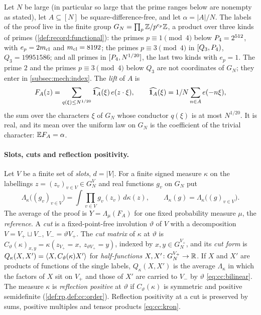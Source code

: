 Let $N$ be large (in particular so large that the prime ranges
below are nonempty as stated), let $A\subseteq[N]$ be square-difference-free, and let
$\alpha=|A|/N$. The labels of the proof live in the finite group
$G_N=\prod_p\mathbb Z/p^{e_p}\mathbb Z$, a product over three kinds of primes
(\cref{def:record:functional}): the primes $p\equiv1\pmod4$ below
$P_4=2^{512}$, with $e_p=2m_{\mathrm{cl}}$ and $m_{\mathrm{cl}}=8192$; the primes
$p\equiv3\pmod4$ in $[Q_3,P_4)$, $Q_3=19951586$; and all primes in
$[P_4,N^{1/20}]$, the last two kinds with $e_p=1$. The prime $2$ and the
primes $p\equiv3\pmod4$ below $Q_3$ are not coordinates of $G_N$; they enter
in \cref{subsec:mech:index}. The \emph{lift} of $A$ is
\[
 F_A(z)=\sum_{q(\xi)\le N^{1/20}}\widehat{\mathbf 1_A}(\xi)\,e(z\cdot\xi),
 \qquad\widehat{\mathbf 1_A}(\xi)=1/N\sum_{n\in A}e(-n\xi),
\]
the sum over the characters $\xi$ of $G_N$ whose conductor $q(\xi)$ is at
most $N^{1/20}$. It is real, and its mean over the uniform law on $G_N$ is the
coefficient of the trivial
character: $\mathbb E F_A=\alpha$.

\paragraph{Slots, cuts and reflection positivity.}
Let $V$ be a finite set of \emph{slots}, $d=|V|$. For a finite signed
measure $\kappa$ on the labellings $z=(z_v)_{v\in V}\in G_N^V$ and real
functions $g_v$ on $G_N$ put
\[
 \Lambda_\kappa\bigl((g_v)_{v\in V}\bigr)=\int\prod_{v\in V}g_v(z_v)\,d\kappa(z),
 \qquad\Lambda_\kappa(g)=\Lambda_\kappa\bigl((g)_{v\in V}\bigr).
\]
The average of the proof is $Y=\Lambda_\mu(F_A)$ for one fixed probability
measure $\mu$, the \emph{reference}. A \emph{cut} is a fixed-point-free
involution $\vartheta$ of $V$ with a decomposition $V=V_+\sqcup V_-$,
$V_-=\vartheta V_+$. The \emph{cut matrix} of $\kappa$ at $\vartheta$ is
$C_\vartheta(\kappa)_{x,y}=\kappa(z_{V_+}=x,\ z_{\vartheta V_+}=y)$, indexed by
$x,y\in G_N^{V_+}$, and its \emph{cut form} is
$Q_\kappa(X,X')=\left\langle X,C_\vartheta(\kappa)X'\right\rangle$ for \emph{half-functions}
$X,X'\colon G_N^{V_+}\to\mathbb R$. If $X$ and $X'$ are products of functions of the
single labels, $Q_\kappa(X,X')$ is the average $\Lambda_\kappa$ in which the
factors of $X$ sit on $V_+$ and those of $X'$ are carried to $V_-$ by
$\vartheta$ \eqref{eq:cc:bilinear}. The measure $\kappa$ is \emph{reflection
positive} at $\vartheta$ if $C_\vartheta(\kappa)$ is symmetric and positive
semidefinite (\cref{def:rp,def:cc:order}). Reflection positivity at a cut is
preserved by sums, positive multiples and tensor products
\eqref{eq:cc:kron}.

